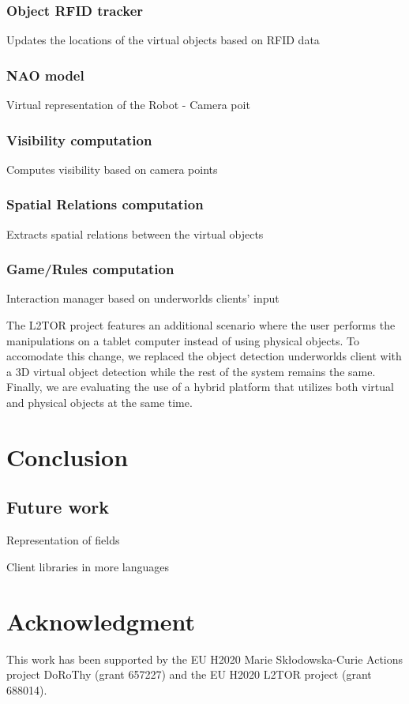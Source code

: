 \documentclass[letterpaper, 10 pt, conference]{ieeeconf}  %
\newcommand{\uwds}{{\sc underworlds}\xspace}
\begin{document}
\subsubsection{Object RFID tracker} {Updates the locations of the virtual objects based on RFID data}
\subsubsection{NAO model}{Virtual representation of the Robot - Camera poit}
\subsubsection{Visibility computation}{Computes visibility based on camera points}
\subsubsection{Spatial Relations computation}{Extracts spatial relations between the virtual objects}
\subsubsection{Game/Rules computation}{Interaction manager based on \uwds clients' input}

The L2TOR project features an additional scenario where the user performs the manipulations on a tablet computer instead of using physical objects. To accomodate this change, we replaced the object detection \uwds client with a 3D virtual object detection while the rest of the system remains the same. Finally, we are evaluating the use of a hybrid platform that utilizes both virtual and physical objects at the same time. 


\section{Conclusion}

\subsection{Future work}
\label{futurework}

Representation of fields

Client libraries in more languages

\section*{Acknowledgment}

This work has been supported by the EU H2020 Marie Sk\l odowska-Curie Actions
project DoRoThy (grant 657227) and the EU H2020 L2TOR project (grant 688014).




\end{document}
